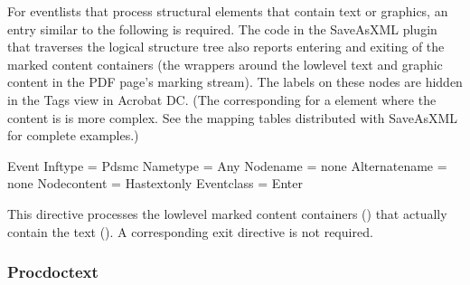 \documentclass[letterpaper,12pt,english,openany,oneside]{sphinxmanual}
\begin{document}
For event\sphinxhyphen{}lists that process structural elements that contain text or graphics, an  entry similar to the following is required. The code in the SaveAsXML plug\sphinxhyphen{}in that traverses the logical structure tree also reports entering and exiting of the marked content containers (the wrappers around the low\sphinxhyphen{}level text and graphic content in the PDF page’s marking stream). The labels on these nodes are hidden in the Tags view in Acrobat DC. (The corresponding  for a  element where the content is  is more complex. See the mapping tables distributed with SaveAsXML for complete examples.)

\begin{sphinxVerbatim}[commandchars=\\\{\}]
\PYGZlt{}Event Inf\PYGZhy{}type = \PYGZdq{}Pds\PYGZhy{}mc\PYGZdq{} Name\PYGZhy{}type = \PYGZdq{}Any\PYGZdq{} Node\PYGZhy{}name = \PYGZdq{}\PYGZhy{}none\PYGZhy{}\PYGZdq{}
              Alternate\PYGZhy{}name = \PYGZdq{}\PYGZhy{}none\PYGZhy{}\PYGZdq{} Node\PYGZhy{}content = \PYGZdq{}Has\PYGZhy{}text\PYGZhy{}only\PYGZdq{}
              Event\PYGZhy{}class = \PYGZdq{}Enter\PYGZdq{}\PYGZgt{}
\end{sphinxVerbatim}

This  directive processes the low\sphinxhyphen{}level marked content containers () that actually contain the text (). A corresponding exit directive is not required.


\subsubsection{Proc\sphinxhyphen{}doc\sphinxhyphen{}text}
\label{\detokenize{index:proc-doc-text}}
\begin{sphinxVerbatim}[commandchars=\\\{\}]
   
\end{sphinxVerbatim}
\end{document}
